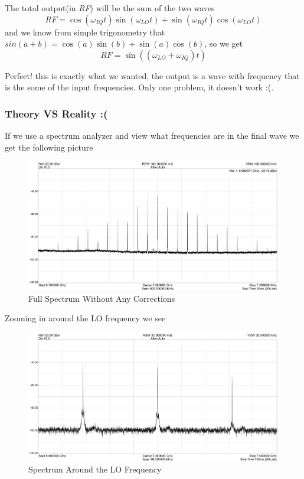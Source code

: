 \documentclass[english, a4paper, 12pt, twoside]{article}
\numberwithin{equation}{section} %
\begin{document}
The total output(in \textit{RF}) will be the sum of the two waves
$$RF = \cos(\omega_{IQ}t)\sin(\omega_{LO}t) + \sin(\omega_{IQ}t)\cos(\omega_{LO}t)$$
and we know from simple trigonometry that $sin(a + b) = \cos(a)\sin(b) + \sin(a)\cos(b)$, so we get
\begin{equation}
    \boxed{RF = \sin((\omega_{LO} + \omega_{IQ})t)}
\end{equation}

Perfect! this is exactly what we wanted, the output is a wave with frequency that is the some of the input frequencies. Only one problem, it doesn't work :(.

\subsubsection{Theory VS Reality :(} %
If we use a spectrum analyzer and view what frequencies are in the final wave we get the following picture

\begin{figure}[H]
    \centering
    \includegraphics[width=0.8\columnwidth]{full-spectrum-no-correction.jpg} %
    \caption{Full Spectrum Without Any Corrections}
    \label{fig:Full-spectrum-no-corrections}
\end{figure}
Zooming in around the LO frequency we see
\begin{figure}[H]
    \centering
    \includegraphics[width=0.8\columnwidth]{Important-Spectrum-no-correction.jpg} %
    \caption{Spectrum Around the LO Frequency}
    \label{fig:closeup-spectrum-no-corrections}
\end{figure}
\end{document}
